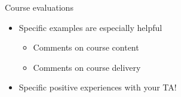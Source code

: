 \documentclass{beamer}
\begin{document}

\begin{frame}{Course evaluations}

\begin{itemize}
\item Specific examples are especially helpful
\begin{itemize}
\item Comments on course content
\item Comments on course delivery
\end{itemize}
\item Specific positive experiences with your TA!
\end{itemize}

\end{frame}
\end{document}
